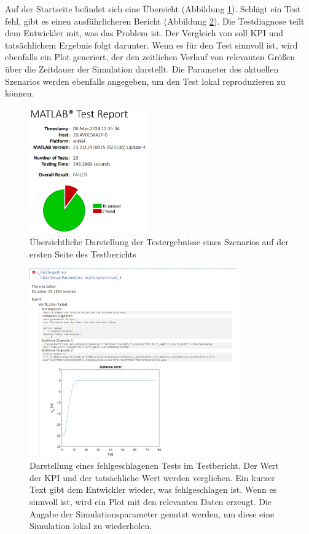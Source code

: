 Auf der Startseite befindet sich eine Übersicht (Abbildung \ref{fig:testreport_aufmacher}). Schlägt ein Test fehl, gibt es einen ausführlicheren Bericht (Abbildung \ref{fig:failed_test}). Die Testdiagnose teilt dem Entwickler mit, was das Problem ist. Der Vergleich von soll KPI und tatsächlichem Ergebnis folgt darunter. Wenn es für den Test sinnvoll ist, wird ebenfalls ein Plot generiert, der den zeitlichen Verlauf von relevanten Größen über die Zeitdauer der Simulation darstellt. Die Parameter des aktuellen Szenarios werden ebenfalls angegeben, um den Test lokal reproduzieren zu können.
\begin{figure}[ht]
    \centering
    \includegraphics[width=0.45\textwidth]{figures/3_Implementierung/testreport_aufmacher.png}
    \caption[Übersichtliche Darstellung der Testergebnisse eines Szenarios]{Übersichtliche Darstellung der Testergebnisse eines Szenarios auf der ersten Seite des Testberichts}
    \label{fig:testreport_aufmacher}
\end{figure}
\begin{figure}[ht]
    \centering
    \includegraphics[width=0.8\textwidth]{figures/3_Implementierung/failed_test.png}
    \caption[Darstellung eines fehlgeschlagenen Tests im Testbericht]{Darstellung eines fehlgeschlagenen Tests im Testbericht. Der Wert der KPI und der tatsächliche Wert werden verglichen. Ein kurzer Text gibt dem Entwickler wieder, was fehlgeschlagen ist. Wenn es sinnvoll ist, wird ein Plot mit den relevanten Daten erzeugt. Die Angabe der Simulationsparameter genutzt werden, um diese eine Simulation lokal zu wiederholen.}
    \label{fig:failed_test}
\end{figure}